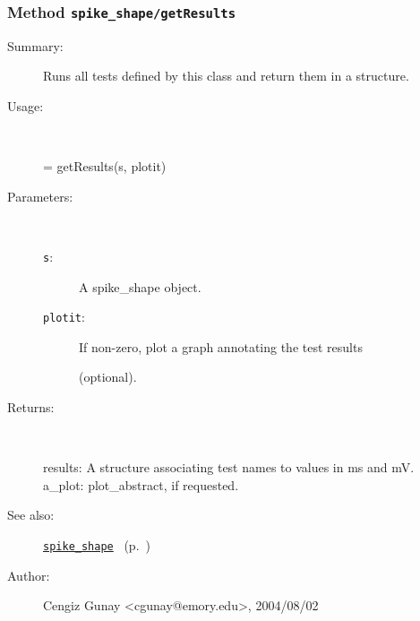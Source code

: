 \subsubsection[Method \texttt{getResults}]{Method \texttt{spike\_shape/getResults}}%
%
\label{ref_spike_shape__getResults}%
\hypertarget{ref_spike_shape__getResults}{}%
\begin{description}
\item[Summary:]Runs all tests defined by this class and return them in a 
		structure.
%
\item[Usage:]~%
\begin{lyxcode}%
[results, a\_plot] = getResults(s, plotit)
%
\end{lyxcode}%
%
%
\item[Parameters:]~
\begin{description}%
\item[\texttt{s}:]
 A spike\_shape object.
\item[\texttt{plotit}:]
 If non-zero, plot a graph annotating the test results 

(optional).\end{description}%
%
\item[Returns:]~

	results: A structure associating test names to values in ms and mV.
	a\_plot: plot\_abstract, if requested.
%
%
\item[See also:]%
\hyperlink{ref_spike_shape}{\texttt{spike\_shape}}%
\ (p.~\pageref{ref_spike_shape})%
%
%
\item[Author:]%
Cengiz Gunay <cgunay@emory.edu>, 2004/08/02%
\end{description}
\methodline%
